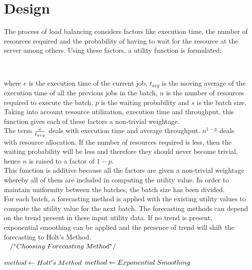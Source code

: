 \documentclass[conference]{IEEEtran}
\begin{document}
\section{Design}
The process of load balancing considers factors like execution time, the number of resources required and the probability of having to wait for the resource at the server among others. Using these factors, a utility function is formulated:
\begin{center}
\setlength{\fboxrule}{0.5mm}
\\
\end{center}
\vspace{0.1cm}
where $e$ is the execution time of the current job, $t_{avg}$ is the moving average of the execution time of all the previous jobs in the batch, $n$ is the number of resources required to execute the batch, $p$ is the waiting probability and $s$ is the batch size. Taking into account resource utilization, execution time and throughput, this function gives each of these factors a non-trivial weightage.\\[0.2cm]
The term $e \over t_{avg}$ deals with execution time and average throughput. $n^{1-p}$ deals with resource allocation. If the number of resources required is less, then the waiting probability will be less and therefore they should never become trivial, hence $n$ is raised to a factor of $1-p$.\\[0.2cm]
This function is additive because all the factors are given a non-trivial weightage whereby all of them are included in computing the utility value. In order to maintain uniformity between the batches, the batch size has been divided.\\[0.2cm]
For each batch, a forecasting method is applied with the existing utility values to compute the utility value for the next batch. The forecasting methods can depend on the trend present in these input utility data. If no trend is present, exponential smoothing can be applied and the presence of trend will shift the forecasting to Holt's Method.\\[0.2cm]
$\hspace*{3mm}/^\ast Choosing\hspace*{1mm}Forecasting\hspace*{1mm}Method^\ast/$\\
\begin{algorithmic}
	\STATE $method \gets Holt's\hspace*{1mm}Method$
\ELSE
	\STATE $method \gets Exponential\hspace*{1mm}Smoothing$ 
\ENDIF
\end{algorithmic}
\end{document}
